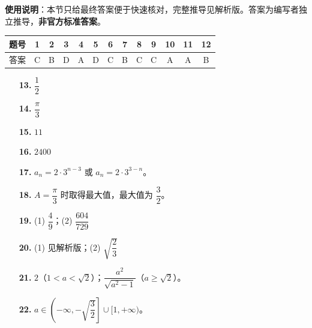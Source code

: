 
\begin{gknotice}
\textbf{使用说明}：本节只给最终答案便于快速核对，完整推导见解析版。答案为编写者独立推导，\textbf{非官方标准答案}。
\end{gknotice}

\begin{center}\begin{tabular}{ccccccccccccc}
\toprule
题号 & 1 & 2 & 3 & 4 & 5 & 6 & 7 & 8 & 9 & 10 & 11 & 12 \\
\midrule
答案 & C & B & D & A & D & C & B & C & C & A & A & B \\
\bottomrule
\end{tabular}\end{center}

\begin{itemize}[leftmargin=2.6em]
  \item[\textbf{13.}] $\dfrac12$
  \item[\textbf{14.}] $\dfrac\pi3$
  \item[\textbf{15.}] $11$
  \item[\textbf{16.}] $2400$
\end{itemize}

\begin{itemize}[leftmargin=2.6em]
  \item[\textbf{17.}] $a_n=2\cdot3^{n-3}$ 或 $a_n=2\cdot3^{3-n}$。
  \item[\textbf{18.}] $A=\dfrac\pi3$ 时取得最大值，最大值为 $\dfrac32$。
  \item[\textbf{19.}] (1) $\dfrac49$；(2) $\dfrac{604}{729}$
  \item[\textbf{20.}] (1) 见解析版；(2) $\sqrt{\dfrac23}$
  \item[\textbf{21.}] $2$（$1<a<\sqrt2$）；$\dfrac{a^2}{\sqrt{a^2-1}}$（$a\geqslant\sqrt2$）。
  \item[\textbf{22.}] $a\in\left(-\infty,-\sqrt{\dfrac32}\right]\cup[1,+\infty)$。
\end{itemize}
